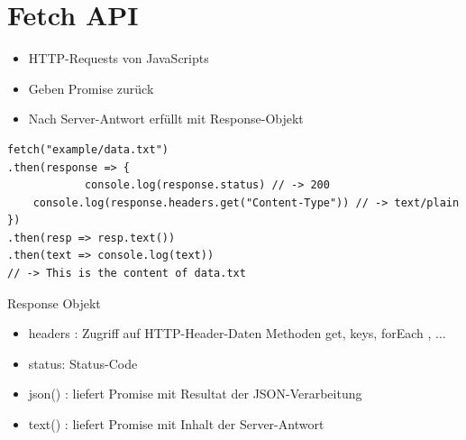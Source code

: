 \section*{Fetch API}
\begin{itemize}
  \item HTTP-Requests von JavaScripts
  \item Geben Promise zurück
  \item Nach Server-Antwort erfüllt mit Response-Objekt
\end{itemize}

\begin{verbatim}
fetch("example/data.txt")
.then(response => {
            console.log(response.status) // -> 200
    console.log(response.headers.get("Content-Type")) // -> text/plain
})
.then(resp => resp.text())
.then(text => console.log(text))
// -> This is the content of data.txt
\end{verbatim}

Response Objekt

\begin{itemize}
  \item headers : Zugriff auf HTTP-Header-Daten Methoden get, keys, forEach , ...
  \item status: Status-Code
  \item json() : liefert Promise mit Resultat der JSON-Verarbeitung
  \item text() : liefert Promise mit Inhalt der Server-Antwort
\end{itemize}